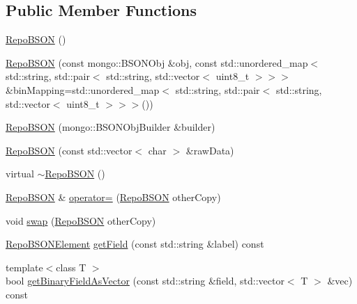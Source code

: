 \subsection*{Public Member Functions}
\begin{DoxyCompactItemize}
\item 
\hyperlink{classrepo_1_1core_1_1model_1_1_repo_b_s_o_n_a354d143bf35f8bc6c4224835f6ba9ca5}{Repo\+B\+S\+O\+N} ()
\item 
\hyperlink{classrepo_1_1core_1_1model_1_1_repo_b_s_o_n_aabc885b5853e080d67b40f1a5e246844}{Repo\+B\+S\+O\+N} (const mongo\+::\+B\+S\+O\+N\+Obj \&obj, const std\+::unordered\+\_\+map$<$ std\+::string, std\+::pair$<$ std\+::string, std\+::vector$<$ uint8\+\_\+t $>$$>$$>$ \&bin\+Mapping=std\+::unordered\+\_\+map$<$ std\+::string, std\+::pair$<$ std\+::string, std\+::vector$<$ uint8\+\_\+t $>$$>$$>$())
\item 
\hyperlink{classrepo_1_1core_1_1model_1_1_repo_b_s_o_n_aa06f776e2e40cfdc2987b862830ac0d9}{Repo\+B\+S\+O\+N} (mongo\+::\+B\+S\+O\+N\+Obj\+Builder \&builder)
\item 
\hyperlink{classrepo_1_1core_1_1model_1_1_repo_b_s_o_n_a24345f6cbb37297891d438137392d14a}{Repo\+B\+S\+O\+N} (const std\+::vector$<$ char $>$ \&raw\+Data)
\item 
virtual \hyperlink{classrepo_1_1core_1_1model_1_1_repo_b_s_o_n_a67460b346bf65fab93b57fdaf8b3048c}{$\sim$\+Repo\+B\+S\+O\+N} ()
\item 
\hyperlink{classrepo_1_1core_1_1model_1_1_repo_b_s_o_n}{Repo\+B\+S\+O\+N} \& \hyperlink{classrepo_1_1core_1_1model_1_1_repo_b_s_o_n_a57637989afe6afdad35530365d8881c4}{operator=} (\hyperlink{classrepo_1_1core_1_1model_1_1_repo_b_s_o_n}{Repo\+B\+S\+O\+N} other\+Copy)
\item 
void \hyperlink{classrepo_1_1core_1_1model_1_1_repo_b_s_o_n_a55fbe89c9c724ea6f2413c60d7510afc}{swap} (\hyperlink{classrepo_1_1core_1_1model_1_1_repo_b_s_o_n}{Repo\+B\+S\+O\+N} other\+Copy)
\item 
\hyperlink{classrepo_1_1core_1_1model_1_1_repo_b_s_o_n_element}{Repo\+B\+S\+O\+N\+Element} \hyperlink{classrepo_1_1core_1_1model_1_1_repo_b_s_o_n_aa2352078eb863b969d3a858166e22803}{get\+Field} (const std\+::string \&label) const 
\item 
{\footnotesize template$<$class T $>$ }\\bool \hyperlink{classrepo_1_1core_1_1model_1_1_repo_b_s_o_n_a6264631f8009beb55f7402f486fd63f8}{get\+Binary\+Field\+As\+Vector} (const std\+::string \&field, std\+::vector$<$ T $>$ \&vec) const 
\item 

\end{DoxyCompactItemize}
